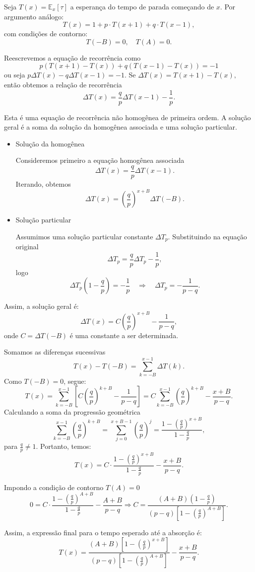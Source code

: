 \documentclass{article}
\begin{document}
Seja \( T(x) = \mathbb{E}_x[\tau] \) a esperança do tempo de parada começando de \( x \).
Por argumento análogo:
\[
T(x) = 1 + p \cdot T(x + 1) + q \cdot T(x - 1),
\]
com condições de contorno:
\[
T(-B) = 0, \quad T(A) = 0.
\]

Reescrevemos a equação de recorrência como
\[
p (T(x + 1) - T(x)) + q (T(x - 1) - T(x)) = -1
\]
ou seja \( 
p \Delta T(x) - q \Delta T(x - 1) = -1.
\)
Se \(
\Delta T(x) = T(x + 1) - T(x),
\)
então obtemos a relação de recorrência
\[
\Delta T(x) = \frac{q}{p} \Delta T(x - 1) - \frac{1}{p}.
\]

Esta é uma equação de recorrência não homogênea de primeira ordem. A
solução geral é a soma da solução da homogênea associada e uma solução
particular.

\begin{itemize}
\item Solução da homogênea

  
Consideremos primeiro a equação homogênea associada
\[
\Delta T(x) = \frac{q}{p} \Delta T(x - 1).
\]
Iterando, obtemos
\[
\Delta T(x) = \left(\frac{q}{p}\right)^{x + B} \Delta T(-B).
\]

\item Solução particular
  
Assumimos uma solução particular constante \(\Delta T_p\). Substituindo na equação original
\[
\Delta T_p = \frac{q}{p} \Delta T_p - \frac{1}{p},
\]
logo
\[
\Delta T_p \left(1 - \frac{q}{p}\right) = -\frac{1}{p}
\quad \Rightarrow \quad
\Delta T_p = -\frac{1}{p - q}.
\]
  
\end{itemize}



Assim, a solução geral é:
\[
\Delta T(x) = C \left(\frac{q}{p}\right)^{x + B} - \frac{1}{p - q},
\]
onde \( C = \Delta T(-B) \) é uma constante a ser determinada.


Somamos as diferenças sucessivas
\[
T(x) -  T(-B) =  \sum_{k = -B}^{x - 1} \Delta T(k).
\]
Como \( T(-B) = 0 \), segue:
\[
T(x) = \sum_{k = -B}^{x - 1} \left[ C \left(\frac{q}{p}\right)^{k + B} - \frac{1}{p - q} \right]
= C \sum_{k = -B}^{x - 1} \left(\frac{q}{p}\right)^{k + B} - \frac{x + B}{p - q}.
\]
Calculando a soma da progressão geométrica
\[
\sum_{k = -B}^{x - 1} \left(\frac{q}{p}\right)^{k + B} = \sum_{j = 0}^{x + B - 1} \left(\frac{q}{p}\right)^j = \frac{1 - \left(\frac{q}{p}\right)^{x + B}}{1 - \frac{q}{p}},
\]
para \(\frac{q}{p} \neq 1\). Portanto, temos:
\[
T(x) = C \cdot \frac{1 - \left(\frac{q}{p}\right)^{x + B}}{1 - \frac{q}{p}} - \frac{x + B}{p - q}.
\]


Impondo a condição de contorno \( T(A) = 0 \)
\[
0 = C \cdot \frac{1 - \left(\frac{q}{p}\right)^{A + B}}{1 - \frac{q}{p}} - \frac{A + B}{p - q}
\Longrightarrow
C = \frac{(A + B)(1 - \frac{q}{p})}{(p - q) \left[1 - \left(\frac{q}{p}\right)^{A + B}\right]}.
\]


Assim, a expressão final para o tempo esperado até a absorção é:
\[
T(x) = \frac{(A + B)\left[1 - \left(\frac{q}{p}\right)^{x + B}\right]}{(p - q)\left[1 - \left(\frac{q}{p}\right)^{A + B}\right]} - \frac{x + B}{p - q}.
\]
\end{document}
